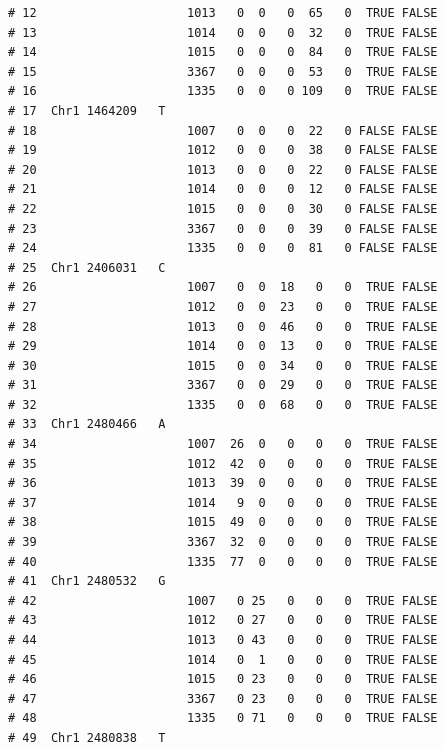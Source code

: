 \documentclass{article}\usepackage[]{graphicx}\usepackage[]{color}
\makeatletter
\newenvironment{kframe}{%
 \def\at@end@of@kframe{}%
 \ifinner\ifhmode%
  \def\at@end@of@kframe{\end{minipage}}%
  \begin{minipage}{\columnwidth}%
 \fi\fi%
 \def\FrameCommand##1{\hskip\@totalleftmargin \hskip-\fboxsep
 \colorbox{shadecolor}{##1}\hskip-\fboxsep
     \hskip-\linewidth \hskip-\@totalleftmargin \hskip\columnwidth}%
 \MakeFramed {\advance\hsize-\width
   \@totalleftmargin\z@ \linewidth\hsize
   \@setminipage}}%
 {\par\unskip\endMakeFramed%
 \at@end@of@kframe}
\newenvironment{knitrout}{}{} %
\makeatother
\begin{document}
\begin{knitrout}
\begin{kframe}
\begin{verbatim}
# 12                     1013   0  0   0  65   0  TRUE FALSE        
# 13                     1014   0  0   0  32   0  TRUE FALSE        
# 14                     1015   0  0   0  84   0  TRUE FALSE        
# 15                     3367   0  0   0  53   0  TRUE FALSE        
# 16                     1335   0  0   0 109   0  TRUE FALSE        
# 17  Chr1 1464209   T                                              
# 18                     1007   0  0   0  22   0 FALSE FALSE        
# 19                     1012   0  0   0  38   0 FALSE FALSE        
# 20                     1013   0  0   0  22   0 FALSE FALSE        
# 21                     1014   0  0   0  12   0 FALSE FALSE        
# 22                     1015   0  0   0  30   0 FALSE FALSE        
# 23                     3367   0  0   0  39   0 FALSE FALSE        
# 24                     1335   0  0   0  81   0 FALSE FALSE        
# 25  Chr1 2406031   C                                              
# 26                     1007   0  0  18   0   0  TRUE FALSE        
# 27                     1012   0  0  23   0   0  TRUE FALSE        
# 28                     1013   0  0  46   0   0  TRUE FALSE        
# 29                     1014   0  0  13   0   0  TRUE FALSE        
# 30                     1015   0  0  34   0   0  TRUE FALSE        
# 31                     3367   0  0  29   0   0  TRUE FALSE        
# 32                     1335   0  0  68   0   0  TRUE FALSE        
# 33  Chr1 2480466   A                                              
# 34                     1007  26  0   0   0   0  TRUE FALSE        
# 35                     1012  42  0   0   0   0  TRUE FALSE        
# 36                     1013  39  0   0   0   0  TRUE FALSE        
# 37                     1014   9  0   0   0   0  TRUE FALSE        
# 38                     1015  49  0   0   0   0  TRUE FALSE        
# 39                     3367  32  0   0   0   0  TRUE FALSE        
# 40                     1335  77  0   0   0   0  TRUE FALSE        
# 41  Chr1 2480532   G                                              
# 42                     1007   0 25   0   0   0  TRUE FALSE        
# 43                     1012   0 27   0   0   0  TRUE FALSE        
# 44                     1013   0 43   0   0   0  TRUE FALSE        
# 45                     1014   0  1   0   0   0  TRUE FALSE        
# 46                     1015   0 23   0   0   0  TRUE FALSE        
# 47                     3367   0 23   0   0   0  TRUE FALSE        
# 48                     1335   0 71   0   0   0  TRUE FALSE        
# 49  Chr1 2480838   T                                              

\end{verbatim}
\end{kframe}
\end{knitrout}
\end{document}
